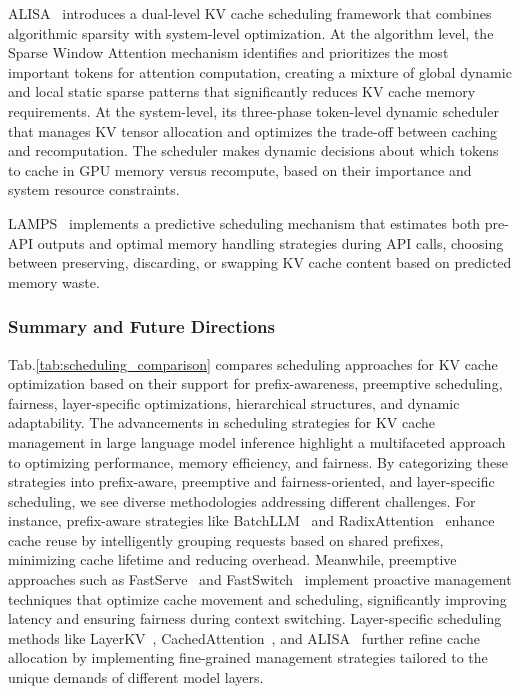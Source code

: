 ALISA~\cite{zhao2024alisaacceleratinglargelanguage} introduces a dual-level KV cache scheduling framework that combines algorithmic sparsity with system-level optimization. At the algorithm level, the Sparse Window Attention mechanism identifies and prioritizes the most important tokens for attention computation, creating a mixture of global dynamic and local static sparse patterns that significantly reduces KV cache memory requirements. At the system-level, its three-phase token-level dynamic scheduler that manages KV tensor allocation and optimizes the trade-off between caching and recomputation. The scheduler makes dynamic decisions about which tokens to cache in GPU memory versus recompute, based on their importance and system resource constraints. 

LAMPS~\cite{shahout2024fastinferenceaugmentedlarge} implements a predictive scheduling mechanism that estimates both pre-API outputs and optimal memory handling strategies during API calls, choosing between preserving, discarding, or swapping KV cache content based on predicted memory waste.






\subsubsection{Summary and Future Directions} 
Tab.\ref{tab:scheduling_comparison} compares scheduling approaches for KV cache optimization based on their support for prefix-awareness, preemptive scheduling, fairness, layer-specific optimizations, hierarchical structures, and dynamic adaptability.
The advancements in scheduling strategies for KV cache management in large language model inference highlight a multifaceted approach to optimizing performance, memory efficiency, and fairness. By categorizing these strategies into prefix-aware, preemptive and fairness-oriented, and layer-specific scheduling, we see diverse methodologies addressing different challenges. For instance, prefix-aware strategies like BatchLLM~\cite{zheng2024batchllmoptimizinglargebatched} and RadixAttention~\cite{zheng2024sglangefficientexecutionstructured} enhance cache reuse by intelligently grouping requests based on shared prefixes, minimizing cache lifetime and reducing overhead. Meanwhile, preemptive approaches such as FastServe~\cite{wu2024fastdistributedinferenceserving} and FastSwitch~\cite{shen2024fastswitchoptimizingcontextswitching} implement proactive management techniques that optimize cache movement and scheduling, significantly improving latency and ensuring fairness during context switching. Layer-specific scheduling methods like LayerKV~\cite{xiong2024layerkvoptimizinglargelanguage}, CachedAttention~\cite{gao2024costefficientlargelanguagemodel}, and ALISA~\cite{zhao2024alisaacceleratinglargelanguage} further refine cache allocation by implementing fine-grained management strategies tailored to the unique demands of different model layers. 

